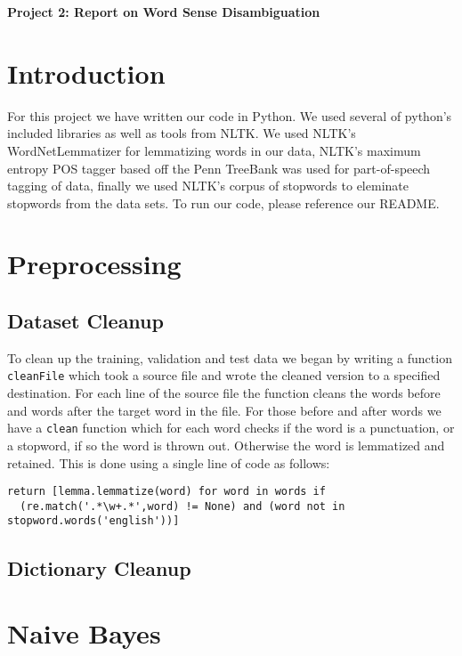 \documentclass{article}
\begin{document}
\begin{center}\textbf{Project 2: Report on Word Sense Disambiguation}\end{center}

\section{Introduction}

For this project we have written our code in Python. We used several of python's included libraries as well as tools from NLTK. We used NLTK's WordNetLemmatizer for lemmatizing words in our data, NLTK's maximum entropy POS tagger based off the Penn TreeBank was used for part-of-speech tagging of data, finally we used NLTK's corpus of stopwords to eleminate stopwords from the data sets. To run our code, please reference our README.

\section{Preprocessing}

\subsection{Dataset Cleanup}

To clean up the training, validation and test data we began by writing a function \texttt{cleanFile} which took a source file and wrote the cleaned version to a specified destination. For each line of the source file the function cleans the words before and words after the target word in the file. For those before and after words we have a \texttt{clean} function which for each word checks if the word is a punctuation, or a stopword, if so the word is thrown out. Otherwise the word is lemmatized and retained. This is done using a single line of code as follows:

{\small
\begin{verbatim}
return [lemma.lemmatize(word) for word in words if
  (re.match('.*\w+.*',word) != None) and (word not in stopword.words('english'))]
\end{verbatim}
}

\subsection{Dictionary Cleanup}

\section{Naive Bayes}
\end{document}
